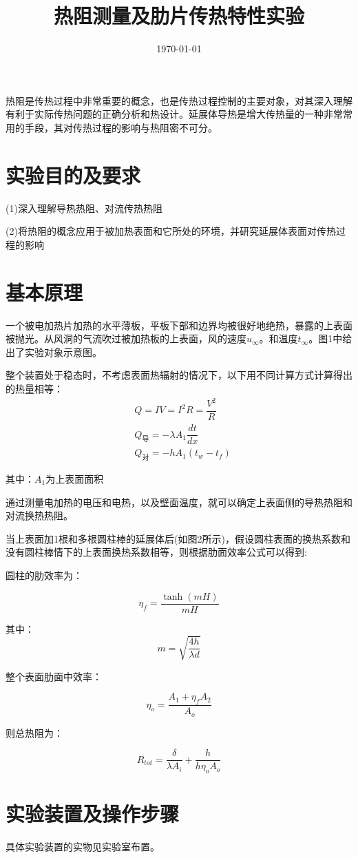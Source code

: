 \documentclass[UTF8,a4paper,10pt]{ctexart}
\title{\textbf{热阻测量及肋片传热特性实验}}
\author{}
\date{\today}
\begin{document}
	\maketitle
	热阻是传热过程中非常重要的概念，也是传热过程控制的主要对象，对其深入理解有利于实际传热问题的正确分析和热设计。延展体导热是增大传热量的一种非常常用的手段，其对传热过程的影响与热阻密不可分。
	
	
	
	\section{实验目的及要求}
	(1)深入理解导热热阻、对流传热热阻
	
	(2)将热阻的概念应用于被加热表面和它所处的环境，并研究延展体表面对传热过程的影响
	
	\section{基本原理}
	一个被电加热片加热的水平薄板，平板下部和边界均被很好地绝热，暴露的上表面被抛光。从风洞的气流吹过被加热板的上表面，风的速度$u_\infty$。和温度$t_\infty$。图1中给出了实验对象示意图。
	
	整个装置处于稳态时，不考虑表面热辐射的情况下，以下用不同计算方式计算得出的热量相等：
	\begin{align*}
	&Q=IV=I^{2}R=\dfrac{V^{2}}{R}\\
	&Q_{\text{导}}=-\lambda A_{1}\dfrac{dt}{dx}\\
	&Q_{\text{对}}=-h A_{1}(t_{w}-t_{f})
	\end{align*}
	
	其中：$A_{1}$为上表面面积
	
	通过测量电加热的电压和电热，以及壁面温度，就可以确定上表面侧的导热热阻和对流换热热阻。
	
	当上表面加1根和多根圆柱棒的延展体后(如图2所示)，假设圆柱表面的换热系数和没有圆柱棒情下的上表面换热系数相等，则根据肋面效率公式可以得到:
	
	圆柱的肋效率为：
	
	$$\eta_{f}=\dfrac{\tanh (mH)}{mH}$$
	
	其中：$$m=\sqrt{\dfrac{4h}{\lambda d}}$$
	
	整个表面肋面中效率：
	
	$$\eta_{o}=\dfrac{A_{1}+\eta_{f}A_{2}}{A_{o}}$$
	
	则总热阻为：
	
	$$R_{tot}=\dfrac{\delta}{\lambda A_{i}}+\dfrac{h}{h\eta_{o}A_{o}}$$
	\section{实验装置及操作步骤}
	具体实验装置的实物见实验室布置。
	
\end{document}
